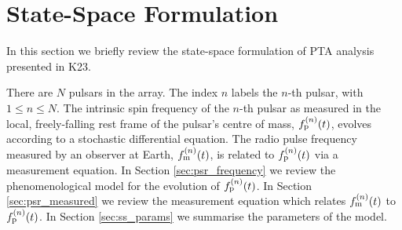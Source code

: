 \documentclass[fleqn,usenatbib,useAMS]{mnras}
\begin{document}
\section{State-Space Formulation}\label{sec:model}
In this section we briefly review the state-space formulation of PTA analysis presented in K23. \newline 

There are $N$ pulsars in the array. The index $n$ labels the $n$-th pulsar, with $1\leq n\leq N$. The intrinsic spin frequency of the $n$-th pulsar as measured in the local, freely-falling rest frame of the pulsar's centre of mass, $f_{\rm p}^{(n)}(t)$, evolves according to a stochastic differential equation. The radio pulse frequency measured by an observer at Earth, $f_{\rm m}^{(n)}(t)$, is related to $f_{\rm p}^{(n)}(t)$ via a measurement equation. In Section \ref{sec:psr_frequency} we review the phenomenological model for the evolution of $f_{\rm p}^{(n)}(t)$. In Section \ref{sec:psr_measured} we review the measurement equation which relates $f_{\rm m}^{(n)}(t)$ to $f_{\rm p}^{(n)}(t)$. In Section \ref{sec:ss_params} we summarise the parameters of the model.
\end{document}
